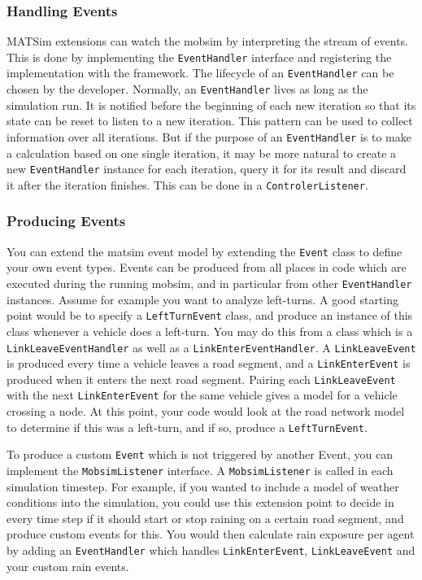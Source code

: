 \subsubsection{Handling Events}
MATSim extensions can watch the \gls{mobsim} by interpreting the stream of \glspl{event}. This is done by implementing the \lstinline|EventHandler| interface and registering the implementation with the framework. The lifecycle of an \lstinline|EventHandler| can be chosen by the developer. Normally, an \lstinline|EventHandler| lives as long as the simulation run.
It is notified before the beginning of each new iteration so that its state can be reset to listen to a new iteration. This pattern can be used to collect information over all iterations. But if the purpose of an \lstinline|EventHandler| is to make a calculation based on one single iteration, it may be more natural to create a new \lstinline|EventHandler| instance for each iteration, query it for its result and discard it after the iteration finishes. This can be done in a \lstinline|ControlerListener|.

\subsubsection{Producing Events}
You can extend the \gls{matsim} event model by extending the \lstinline|Event| class to define your own event types.
Events can be produced from all places in code which are executed during the running \gls{mobsim},
and in particular from other \lstinline|EventHandler| instances. Assume for example you want to analyze
left-turns. A good starting point would be to specify a \lstinline|LeftTurnEvent| class, and produce
an instance of this class whenever a vehicle does a left-turn. You may do this from a class which is a 
\lstinline|LinkLeaveEventHandler| as well as a \lstinline|LinkEnterEventHandler|. 
A \lstinline|LinkLeaveEvent| is produced every time a vehicle leaves a road segment, and a \lstinline|LinkEnterEvent| is
produced when it enters the next road segment. Pairing each \lstinline|LinkLeaveEvent| with the next \lstinline|LinkEnterEvent| for
the same vehicle gives a model for a vehicle crossing a node. At this point, your code would look at the road
network model to determine if this was a left-turn, and if so, produce a \lstinline|LeftTurnEvent|.
    
To produce a custom \lstinline|Event| which is not triggered by another Event, you can implement the
\lstinline|MobsimListener| interface. A \lstinline|MobsimListener| is called in each simulation timestep.
For example, if you wanted to include a model of weather conditions into the simulation, you could use this
extension point to decide in every time step if it should start or stop raining on a certain road segment, 
and produce custom events for this. You would then calculate rain exposure per agent by adding an \lstinline|EventHandler| which 
handles \lstinline|LinkEnterEvent|, \lstinline|LinkLeaveEvent| and your custom rain events. 


